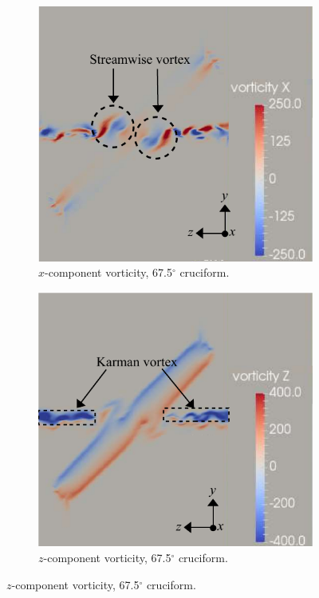 \documentclass[oneside]{utmthesis}
\begin{document}
\begin{figure}[H]
  \centering
  \begin{subfigure}[h]{0.48\textwidth}
    \centering
    \includegraphics[width=1\textwidth]{figs/vorx675}
    \caption{$x$-component vorticity, 67.5$^{\circ}$ cruciform.}
    \label{fig:vorx675}
  \end{subfigure}
  \hfill
  \begin{subfigure}[h]{0.48\textwidth}
    \centering
    \includegraphics[width=1\textwidth]{figs/vorz675}
    \caption{$z$-component vorticity, 67.5$^{\circ}$ cruciform.}
    \label{fig:vorz675}
  \end{subfigure}


\end{figure}
\end{document}
